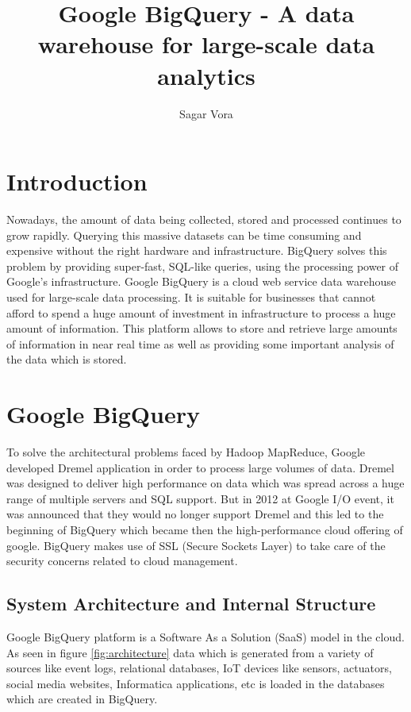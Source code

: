 \documentclass[9pt,twocolumn,twoside]{../../styles/osajnl}
\title{Google BigQuery - A data warehouse for large-scale data analytics}
\author[1]{Sagar Vora}
\affil[1]{School of Informatics and Computing, Bloomington, IN 47408, U.S.A.}
\begin{document}
\maketitle

\section{Introduction}
Nowadays, the amount of data being collected, stored and processed
continues to grow rapidly. Querying this massive datasets can be time
consuming and expensive without the right hardware and
infrastructure. BigQuery\cite{www-bigquery} solves this problem by
providing super-fast, SQL-like queries, using the processing power of
Google's infrastructure. Google BigQuery\cite{bigquery-paper} is a
cloud web service data warehouse used for large-scale data
processing. It is suitable for businesses that cannot afford to spend
a huge amount of investment in infrastructure to process a huge amount
of information. This platform allows to store and retrieve large
amounts of information in near real time as well as providing some
important analysis of the data which is stored.

\section{Google BigQuery}
To solve the architectural problems faced by
Hadoop\cite{www-apache-hadoop} MapReduce\cite{mapreduce-article},
Google developed Dremel\cite{dremel-paper} application in order to
process large volumes of data. Dremel was designed to deliver high
performance on data which was spread across a huge range of multiple
servers and SQL support. But in 2012 at Google I/O event, it was
announced that they would no longer support Dremel and this led to the
beginning of BigQuery which became then the high-performance cloud
offering of google. BigQuery makes use of SSL (Secure Sockets Layer)
to take care of the security concerns related to cloud management.

\subsection{System Architecture and Internal Structure}

Google BigQuery platform is a Software As a Solution (SaaS) model in
the cloud. As seen in figure \ref{fig:architecture} data which is
generated from a variety of sources like event logs, relational
databases, IoT devices like sensors, actuators, social media websites,
Informatica\cite{www-informatica} applications, etc is loaded in the
databases which are created in BigQuery.
\end{document}
